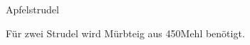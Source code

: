 \begin{recipe}[\vegetarian]{Apfelstrudel}

    \begin{ingredients}
    \end{ingredients}

    \begin{instructions}
        Für zwei Strudel wird Mürbteig aus 450\gram Mehl benötigt.
    \end{instructions}
\end{recipe}
